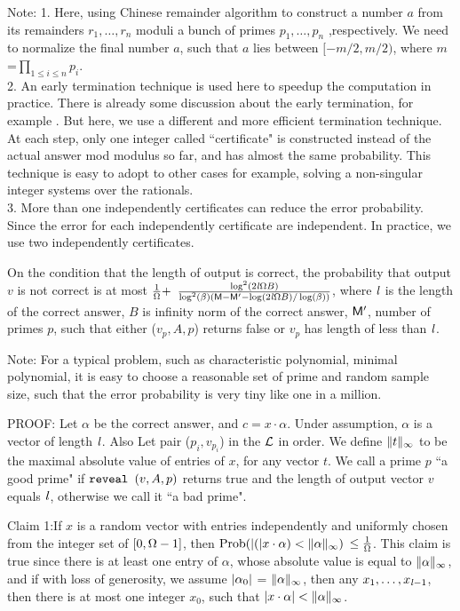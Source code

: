 Note:
1. Here, using Chinese remainder algorithm to construct a number $a$ from
its remainders $r_1, \ldots, r_n$ moduli a bunch of primes $p_1, \ldots, p_n$
,respectively. We need to normalize the final number $a$, 
such that $a$ lies between $[-m/2, m/2)$, 
where $m$=$\prod_{1\leq i \leq n} p_i$.\\
2. An early termination technique is used here to speedup the computation 
in practice. There is already some discussion about the early termination, 
for example \cite{Emiris98}.
But here, we use a different and more efficient termination technique.
At each step, only one integer called ``certificate" is constructed 
instead of the actual answer mod modulus so far, and has almost
the same probability. This technique is easy to adopt to other cases
for example, solving a non-singular integer systems over the rationals.\\
3. More than one independently certificates can reduce the error probability.
Since the error for each independently certificate are independent.
In practice, we use two independently certificates.
\begin{theorem}
On the condition that the length of output is correct,
the probability that output $v$ is not correct
is at most
$\frac{1}{\Omega} +$
$\frac{\log^2(2\mathit l \Omega B)}
{\log^2(\beta) (\mathsf M - \mathsf M^\prime - \log(2\mathit l \Omega B) / \log(\beta))}$,
where $\mathit l$ is the length of the correct answer,
$B$ is infinity norm of the correct answer,
$\mathsf M^\prime$, number of primes $p$, 
such that either \reveal($v_p, A, p$) returns false
or $v_p$ has length of less than $\mathit l$.
\end{theorem}

Note: For a typical problem, such as characteristic polynomial, 
minimal polynomial, it is easy to choose a reasonable set of prime 
and random sample size,
such that the error probability is very tiny like one in a million.

PROOF:
Let $\alpha$ be the correct answer, 
and $c = x \cdot \alpha$.
Under assumption, $\alpha$ is a vector of length $\mathit l$.
Also Let pair ($p_i, v_{p_i}$)  in the $\mathcal L$ in order.
We define $\|t\|_\infty$ to be  the maximal absolute value of entries of $x$,
for any vector $t$. 
We call a prime $p$ ``a good prime" if $\mbox{\tt reveal }(v, A, p)$
returns true and the length of output vector $v$
equals $\mathit l$, otherwise we call it
``a bad prime".

Claim 1:If $x$ is a random vector with entries 
independently and uniformly chosen from the integer set of $[0, \Omega-1]$,
then $\mbox{Prob} (|(|x \cdot \alpha) < \|\alpha\|_\infty)$
$\leq \frac{1}{\Omega}$.
This claim is true since
there is at least one entry of $\alpha$, whose absolute value is
equal to $\|\alpha\|_\infty$, and
if with loss of generosity, we assume $|\alpha_0|$ = $\|\alpha\|_\infty$,
then any $x_1, \ldots, x_{\mathit l-1}$, then there is at most one integer $x_0$, 
such that $|x \cdot \alpha| < \|\alpha\|_\infty$.

